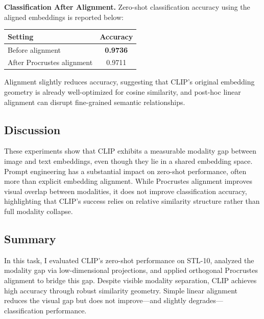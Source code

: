 \documentclass{article}
\begin{document}
\textbf{Classification After Alignment.}  
Zero-shot classification accuracy using the aligned embeddings is reported below:

\begin{center}
\begin{tabular}{l c}
\toprule
Setting & Accuracy \\
\midrule
Before alignment & \textbf{0.9736} \\
After Procrustes alignment & 0.9711 \\
\bottomrule
\end{tabular}
\end{center}

Alignment slightly reduces accuracy, suggesting that CLIP’s original embedding geometry is already well-optimized for cosine similarity, and post-hoc linear alignment can disrupt fine-grained semantic relationships.

\subsection{Discussion}

These experiments show that CLIP exhibits a measurable modality gap between image and text embeddings, even though they lie in a shared embedding space. Prompt engineering has a substantial impact on zero-shot performance, often more than explicit embedding alignment. While Procrustes alignment improves visual overlap between modalities, it does not improve classification accuracy, highlighting that CLIP’s success relies on relative similarity structure rather than full modality collapse.

\subsection{Summary}

In this task, I evaluated CLIP’s zero-shot performance on STL-10, analyzed the modality gap via low-dimensional projections, and applied orthogonal Procrustes alignment to bridge this gap. Despite visible modality separation, CLIP achieves high accuracy through robust similarity geometry. Simple linear alignment reduces the visual gap but does not improve—and slightly degrades—classification performance.
\end{document}
